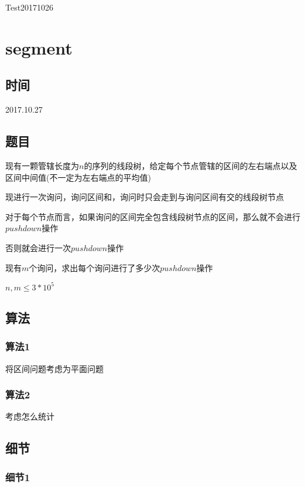 \documentclass[a4paper]{article}
\begin{document}
		Test20171026
	
	\newpage
	
	\section{segment}
		
	\subsection{时间}
		
		2017.10.27
		
	\subsection{题目}
		
		现有一颗管辖长度为$n$的序列的线段树，给定每个节点管辖的区间的左右端点以及区间中间值(不一定为左右端点的平均值)
		
		现进行一次询问，询问区间和，询问时只会走到与询问区间有交的线段树节点
		
		对于每个节点而言，如果询问的区间完全包含线段树节点的区间，那么就不会进行$pushdown$操作
		
		否则就会进行一次$pushdown$操作
		
		现有$m$个询问，求出每个询问进行了多少次$pushdown$操作
		
		$n, m \leq 3*10^5$
		
	\subsection{算法}
		
		\subsubsection{算法1}
		
			将区间问题考虑为平面问题
		
		\subsubsection{算法2}
		
			考虑怎么统计
		
	\subsection{细节}
		
		\subsubsection{细节1}
			
\end{document}
